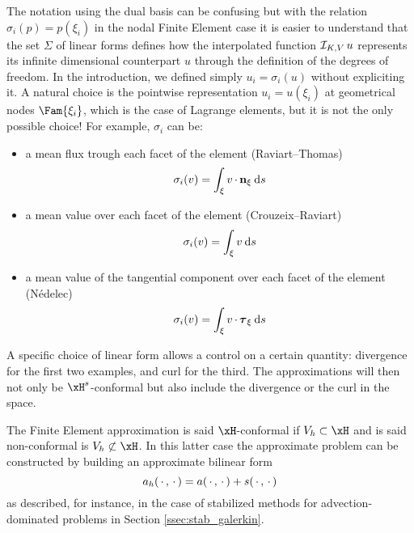 \begin{rmrk}
The notation using the dual basis can be confusing but with the relation $\sigma_i(p) = p(\xi_i)$ in the nodal Finite Element case it is easier to understand that the set $\Sigma$ of linear forms defines how the interpolated function $\mathop{\mathcal{I}_{K,{V}}}u$ represents its infinite dimensional counterpart $u$ through the definition of the degrees of freedom.
In the introduction, we defined simply $u_i = \sigma_i(u)$ without expliciting it. A natural choice is the pointwise representation $u_i = u(\xi_i)$ at geometrical nodes $\Fam{\xi_i}$, which is the case of Lagrange elements, but it is not the only possible choice!
For example, $\sigma_i$ can be:
\begin{itemize}
\item a mean flux trough each facet of the element (Raviart--Thomas)
\begin{equation*}
\sigma_i(v) = \int_\xi v\,{\mathbf\cdot}\,\mathbf n_\xi\hspace{.5ex}{\mathrm d}s
\end{equation*}
\item a mean value over each facet of the element (Crouzeix--Raviart)
\begin{equation*}
\sigma_i(v) = \int_\xi v\hspace{.5ex}{\mathrm d}s
\end{equation*}
\item a mean value of the tangential component over each facet of the element (Nédelec)
\begin{equation*}
\sigma_i(v) = \int_\xi v\,{\mathbf\cdot}\,\boldsymbol\tau_\xi\hspace{.5ex}{\mathrm d}s
\end{equation*}
\end{itemize}
A specific choice of linear form allows a control on a certain quantity: divergence for the first two examples, and curl for the third.
The approximations will then not only be $\xH^s$-conformal but also include the divergence or the curl in the space.
\end{rmrk}

\begin{rmrk}
The Finite Element approximation is said $\xH$-conformal if $\xVh\subset \xH$ and is said non-conformal is $\xVh\not\subset \xH$. In this latter case the approximate problem can be constructed by building an approximate bilinear form
\begin{equation*}
a_h(\,{\mathbf\cdot}\,,\,{\mathbf\cdot}\,) = a(\,{\mathbf\cdot}\,,\,{\mathbf\cdot}\,) + s(\,{\mathbf\cdot}\,,\,{\mathbf\cdot}\,)
\end{equation*}
as described, for instance, in the case of stabilized methods for advection-dominated problems in Section \ref{ssec:stab_galerkin}.
\end{rmrk}

